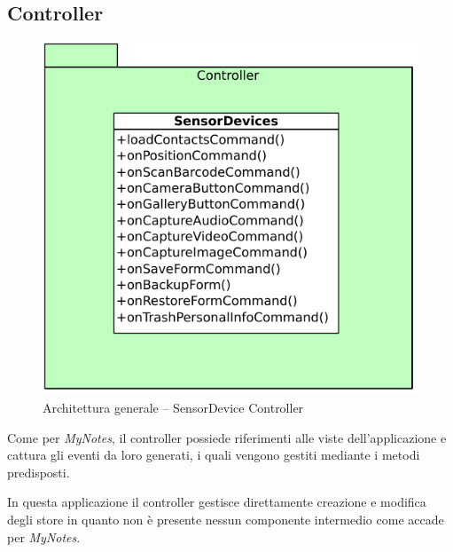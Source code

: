 \subsection{Controller}
\begin{figure}[htb]
\centering
\includegraphics[scale=0.6]{gfx/class/SensorDevice_Controller.pdf}
\caption{Architettura generale -- SensorDevice Controller}
\label{fig:architettura SensorDevice Controller}
\end{figure}
Come per \emph{MyNotes}, il controller possiede riferimenti alle viste dell'applicazione e cattura gli eventi da loro generati, i quali vengono gestiti mediante i metodi predisposti.

In questa applicazione il controller gestisce direttamente creazione e modifica degli store in quanto non è presente nessun componente intermedio come accade per \emph{MyNotes}.
